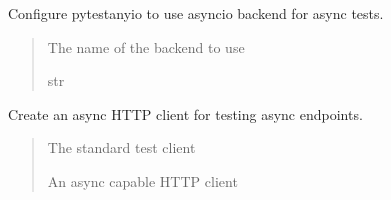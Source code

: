 \documentclass[letterpaper,10pt,openany,oneside,english]{sphinxmanual}
\begin{document}
\begin{savenotes}\begin{fulllineitems}
\label{\detokenize{modules/tests:storeapi.tests.conftest.anyio_backend}}
\pysigstartsignatures
{}
\pysigstopsignatures
\sphinxAtStartPar
Configure pytest\sphinxhyphen{}anyio to use asyncio backend for async tests.
\begin{quote}\begin{description}
\sphinxAtStartPar
The name of the backend to use

\sphinxAtStartPar
str

\end{description}\end{quote}

\end{fulllineitems}\end{savenotes}


\begin{savenotes}\begin{fulllineitems}
\label{\detokenize{modules/tests:storeapi.tests.conftest.async_client_fixture}}
\pysigstartsignatures
{}
\pysigstopsignatures
\sphinxAtStartPar
Create an async HTTP client for testing async endpoints.
\begin{quote}\begin{description}
\sphinxAtStartPar
{} \textendash{} The standard test client

\sphinxAtStartPar
{} \textendash{} An async capable HTTP client

\end{description}\end{quote}

\end{fulllineitems}\end{savenotes}

\end{document}
